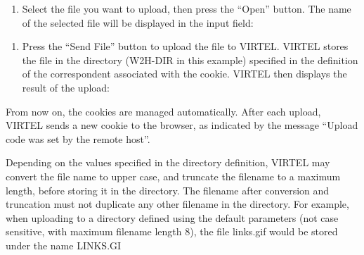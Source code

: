 \documentclass[letterpaper,10pt,english]{sphinxmanual}
\begin{document}

\begin{enumerate}
\def\theenumi{\arabic{enumi}}
\def\labelenumi{\theenumi .}
\makeatletter\def\p@enumii{\p@enumi \theenumi .}\makeatother
\setcounter{enumi}{3}
\item {} 
Select the file you want to upload, then press the “Open” button. The name of the selected file will be displayed in the input field:

\end{enumerate}


\begin{enumerate}
\def\theenumi{\arabic{enumi}}
\def\labelenumi{\theenumi .}
\makeatletter\def\p@enumii{\p@enumi \theenumi .}\makeatother
\setcounter{enumi}{4}
\item {} 
Press the “Send File” button to upload the file to VIRTEL. VIRTEL stores the file in the directory (W2H-DIR in this example) specified in the definition of the correspondent associated with the cookie. VIRTEL then displays the result of the upload:

\end{enumerate}



From now on, the cookies are managed automatically. After each upload, VIRTEL sends a new cookie to the browser, as indicated by the message “Upload code was set by the remote host”.

Depending on the values specified in the directory definition, VIRTEL may convert the file name to upper case, and truncate the filename to a maximum length, before storing it in the directory. The filename after conversion and truncation must not duplicate any other filename in the directory. For example, when uploading to a directory defined using the default parameters (not case sensitive, with maximum filename length 8), the file links.gif would be stored under the name LINKS.GI

\ignorespaces 
\end{document}
